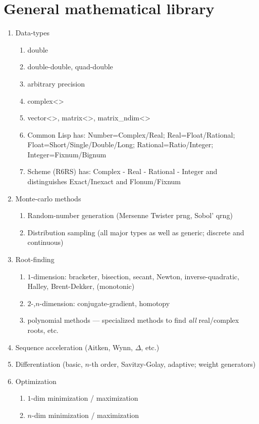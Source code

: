 \documentclass[10pt,dvipdfmx,letterpaper,twoside]{article}
\begin{document}
\section{General mathematical library}
\begin{enumerate}
\item Data-types
  \begin{enumerate}
  \item double
  \item double-double, quad-double
  \item arbitrary precision
  \item complex<>
  \item vector<>, matrix<>, matrix\_ndim<>
  \item Common Lisp has: Number=Complex/Real; Real=Float/Rational; Float=Short/Single/Double/Long; Rational=Ratio/Integer;
    Integer=Fixnum/Bignum
  \item Scheme (R6RS) has: Complex - Real - Rational - Integer and distinguishes Exact/Inexact and Flonum/Fixnum
  \end{enumerate}
\item Monte-carlo methods
  \begin{enumerate}
  \item Random-number generation (Mersenne Twister prng, Sobol' qrng)
  \item Distribution sampling (all major types as well as generic; discrete and continuous)
  \end{enumerate}
\item Root-finding
  \begin{enumerate}
  \item $1$-dimension: bracketer, bisection, secant, Newton, inverse-quadratic, Halley, Brent-Dekker, (monotonic)
  \item $2$-,$n$-dimension: conjugate-gradient, homotopy
  \item polynomial methods --- specialized methods to find {\em all} real/complex roots, etc.
  \end{enumerate}
\item Sequence acceleration (Aitken, Wynn, $\Delta$, etc.)
\item Differentiation (basic, $n$-th order, Savitzy-Golay, adaptive; weight generators)
\item Optimization
  \begin{enumerate}
  \item $1$-dim minimization / maximization
  \item $n$-dim minimization / maximization

\end{enumerate}
\end{enumerate}
\end{document}
